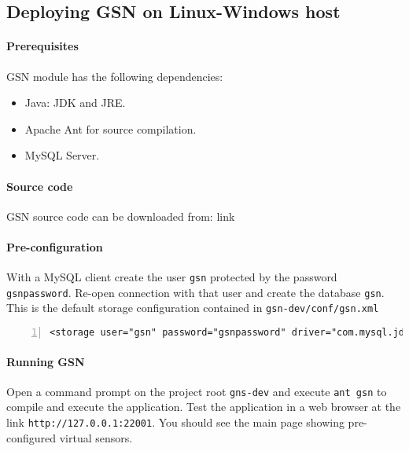 \subsection{Deploying GSN on Linux-Windows host}
\paragraph{Prerequisites} GSN module has the following dependencies:
\begin{itemize}
	\item Java: JDK and JRE.
	\item Apache Ant for source compilation.
	\item MySQL Server.
\end{itemize}
\paragraph{Source code} GSN source code can be downloaded from: link
\paragraph{Pre-configuration} With a MySQL client create the user {\tt gsn} protected by the password {\tt gsnpassword}. 
Re-open connection with that user and create the database {\tt gsn}. This is the default storage configuration contained in {\tt gsn-dev/conf/gsn.xml}
\begin{lstlisting}[numbers=left, breaklines=true]
<storage user="gsn" password="gsnpassword" driver="com.mysql.jdbc.Driver" url="jdbc:mysql://localhost/gsn" />
\end{lstlisting}
\paragraph{Running GSN} Open a command prompt on the project root {\tt gns-dev} and execute 
{\tt ant gsn} to compile and execute the application. Test the application in a web browser at the link
{\tt http://127.0.0.1:22001}. You should see the main page showing pre-configured virtual sensors.
